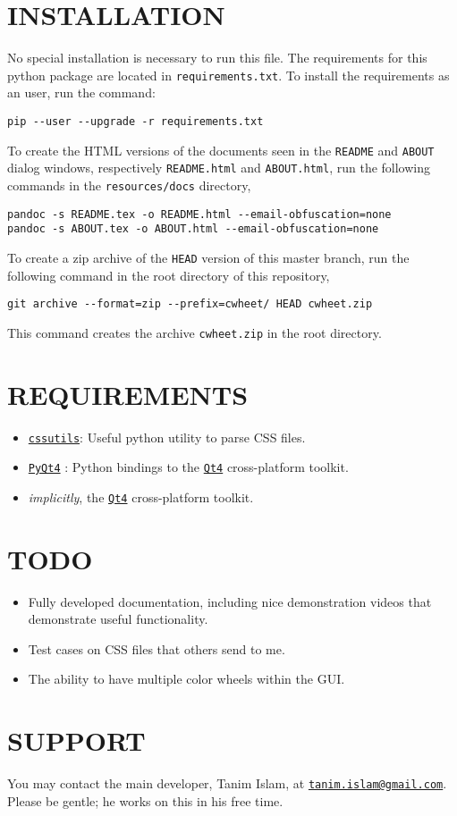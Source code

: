 \documentclass[]{article}
\begin{document}
\section{INSTALLATION}\label{installation}
No special installation is necessary to run this file. The
requirements for this python package are located in
\texttt{requirements.txt}. To install the requirements as an user, run
the command:
\begin{verbatim}
pip --user --upgrade -r requirements.txt
\end{verbatim}
To create the HTML versions of the documents seen in the
\texttt{README} and \texttt{ABOUT} dialog windows, respectively
\texttt{README.html} and \texttt{ABOUT.html}, run the following
commands in the \texttt{resources/docs} directory,
\begin{verbatim}
pandoc -s README.tex -o README.html --email-obfuscation=none
pandoc -s ABOUT.tex -o ABOUT.html --email-obfuscation=none
\end{verbatim}
To create a zip archive of the \texttt{HEAD} version of this master
branch, run the following command in the root directory of this
repository,
\begin{verbatim}
git archive --format=zip --prefix=cwheet/ HEAD cwheet.zip
\end{verbatim}
This command creates the archive \texttt{cwheet.zip} in the root
directory.

\section{REQUIREMENTS}\label{requirements}
\begin{itemize}
  \item \href{http://pythonhosted.org/cssutils/}{\texttt{cssutils}}:
    Useful python utility to parse CSS files.
  \item
    \href{https://www.riverbankcomputing.com/software/pyqt/intro}{\texttt{PyQt4}}
    : Python bindings to the
    \href{http://doc.qt.io/qt-4.8/index.html}{\texttt{Qt4}}
    cross-platform toolkit.
  \item\textit{implicitly}, the \href{http://doc.qt.io/qt-4.8/index.html}{\texttt{Qt4}}
    cross-platform toolkit.
\end{itemize}

\section{TODO}\label{todo}
\begin{itemize}
  \item Fully developed documentation, including nice demonstration
    videos that demonstrate useful functionality.
  \item Test cases on CSS files that others send to me.
  \item The ability to have multiple color wheels within the GUI.
\end{itemize}

\section{SUPPORT}\label{support}
You may contact the main developer, Tanim Islam, at
\href{mailto:tanim.islam@gmail.com}{\texttt{tanim.islam@gmail.com}}. Please
be gentle; he works on this in his free time.
\end{document}
